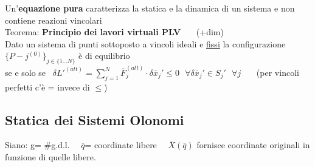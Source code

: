 \documentclass{article}
\begin{document}
%
%
%
%
Un'\textbf{equazione pura} caratterizza la statica e la dinamica di un sistema e non contiene reazioni vincolari\\
%
%
%
Teorema: \textbf{Principio dei lavori virtuali PLV} \ \ \ (+dim)\\
\phantom{\ } Dato un sistema di punti sottoposto a vincoli ideali e \underline{fissi} la configurazione $\{P-j^{(0)}\}_{j\in\{1...N\}}$ è di equilibrio\\ \phantom{\ \ } se e solo se \ $\delta L'^{(att)}=\sum^N_{j=1}\overline{F}_j^{(att)}\cdot \delta \overline{x}_j'\leq 0 \ \ \  \forall\delta\overline{x}_j'\in S_j' \ \ \ \forall j$ \ \ \ (per vincoli perfetti c'è = invece di $\leq$)



\subsection{Statica dei Sistemi Olonomi}
%
Siano: g= $\#$g.d.l. \ \ $\overline{q}$= coordinate libere \ \ $\overline{X}(\overline{q})$ fornisce coordinate originali in funzione di quelle libere.
\end{document}
